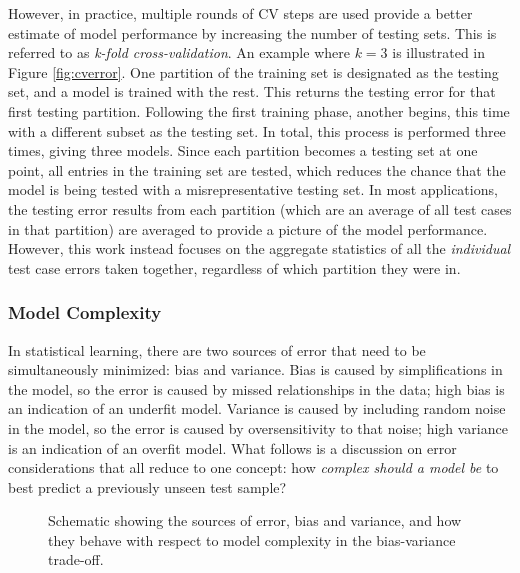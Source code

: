 However, in practice, multiple rounds of \gls{CV} steps are used provide a
better estimate of model performance by increasing the number of testing sets.
This is referred to as \textit{k-fold cross-validation}.  An example where
$k=3$ is illustrated in Figure \ref{fig:cverror}.  One partition of the
training set is designated as the testing set, and a model is trained with the
rest. This returns the testing error for that first testing partition.
Following the first training phase, another begins, this time with a different
subset as the testing set.  In total, this process is performed three times,
giving three models. Since each partition becomes a testing set at one point,
all entries in the training set are tested, which reduces the chance that the
model is being tested with a misrepresentative testing set. In most
applications, the testing error results from each partition (which are an
average of all test cases in that partition) are averaged to provide a picture
of the model performance. However, this work instead focuses on the aggregate
statistics of all the \textit{individual} test case errors taken together,
regardless of which partition they were in.

\subsubsection{Model Complexity}
\label{sec:complexity}

In statistical learning, there are two sources of error that need to be
simultaneously minimized: bias and variance. Bias is caused by simplifications
in the model, so the error is caused by missed relationships in the data; high
bias is an indication of an underfit model.  Variance is caused by including
random noise in the model, so the error is caused by oversensitivity to that
noise; high variance is an indication of an overfit model. What follows is a
discussion on error considerations that all reduce to one concept: how
\textit{complex should a model be} to best predict a previously unseen test
sample?

\begin{figure}[!htb]
  \caption[Schematic of the bias-variance trade-off]
          {Schematic showing the sources of error, bias and variance, and how 
           they behave with respect to model complexity in the bias-variance 
           trade-off.}
  \label{fig:bvtradeoff}
\end{figure}

